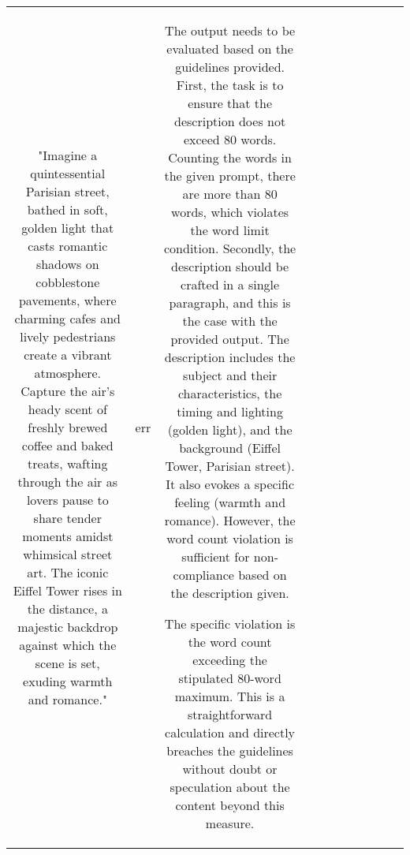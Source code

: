 \begin{table}[h!]
\begin{tabular}{|c|c|c|c|c|c|c|c|c|c|c|}
"Imagine a quintessential Parisian street, bathed in soft, golden light that casts romantic shadows on cobblestone pavements, where charming cafes and lively pedestrians create a vibrant atmosphere. Capture the air's heady scent of freshly brewed coffee and baked treats, wafting through the air as lovers pause to share tender moments amidst whimsical street art. The iconic Eiffel Tower rises in the distance, a majestic backdrop against which the scene is set, exuding warmth and romance." & err & The output needs to be evaluated based on the guidelines provided. First, the task is to ensure that the description does not exceed 80 words. Counting the words in the given prompt, there are more than 80 words, which violates the word limit condition. Secondly, the description should be crafted in a single paragraph, and this is the case with the provided output. The description includes the subject and their characteristics, the timing and lighting (golden light), and the background (Eiffel Tower, Parisian street). It also evokes a specific feeling (warmth and romance). However, the word count violation is sufficient for non-compliance based on the description given.

The specific violation is the word count exceeding the stipulated 80-word maximum. This is a straightforward calculation and directly breaches the guidelines without doubt or speculation about the content beyond this measure.


\end{tabular}
\end{table}
